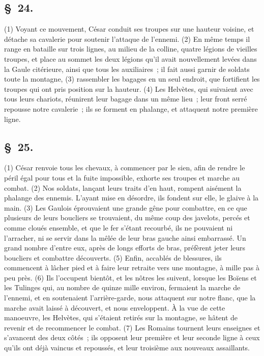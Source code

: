 \documentclass[french,twoside]{book} %
\begin{document}
\subsection[{§ 24.}]{ \textsc{§ 24.} }
\noindent (1) Voyant ce mouvement, César conduit ses troupes sur une hauteur voisine, et détache sa cavalerie pour soutenir l’attaque de l’ennemi. (2) En même temps il range en bataille sur trois lignes, au milieu de la colline, quatre légions de vieilles troupes, et place au sommet les deux légions qu’il avait nouvellement levées dans la Gaule citérieure, ainsi que tous les auxiliaires ; il fait aussi garnir de soldats toute la montagne, (3) rassembler les bagages en un seul endroit, que fortifient les troupes qui ont pris position sur la hauteur. (4) Les Helvètes, qui suivaient avec tous leurs chariots, réunirent leur bagage dans un même lieu ; leur front serré repousse notre cavalerie ; ils se forment en phalange, et attaquent notre première ligne.
\subsection[{§ 25.}]{ \textsc{§ 25.} }
\noindent (1) César renvoie tous les chevaux, à commencer par le sien, afin de rendre le péril égal pour tous et la fuite impossible, exhorte ses troupes et marche au combat. (2) Nos soldats, lançant leurs traits d’en haut, rompent aisément la phalange des ennemis. L'ayant mise en désordre, ils fondent sur elle, le glaive à la main. (3) Les Gaulois éprouvaient une grande gêne pour combattre, en ce que plusieurs de leurs boucliers se trouvaient, du même coup des javelots, percés et comme cloués ensemble, et que le fer s’étant recourbé, ils ne pouvaient ni l’arracher, ni se servir dans la mêlée de leur bras gauche ainsi embarrassé. Un grand nombre d’entre eux, après de longs efforts de bras, préfèrent jeter leurs boucliers et combattre découverts. (5) Enfin, accablés de blessures, ils commencent à lâcher pied et à faire leur retraite vers une montagne, à mille pas à peu près. (6) Ils l’occupent bientôt, et les nôtres les suivent, lorsque les Boïens et les Tulinges qui, au nombre de quinze mille environ, fermaient la marche de l’ennemi, et en soutenaient l’arrière-garde, nous attaquent sur notre flanc, que la marche avait laissé à découvert, et nous enveloppent. À la vue de cette manoeuvre, les Helvètes, qui s’étaient retirés sur la montagne, se hâtent de revenir et de recommencer le combat. (7) Les Romains tournent leurs enseignes et s’avancent des deux côtés ; ils opposent leur première et leur seconde ligne à ceux qu’ils ont déjà vaincus et repoussés, et leur troisième aux nouveaux assaillants.
\end{document}
